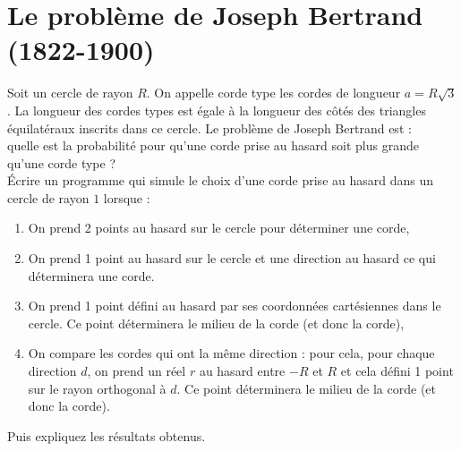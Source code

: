 \documentclass[a4paper,11pt]{book}
\begin{document}
\section{Le probl\`eme de Joseph Bertrand (1822-1900)}
Soit un cercle de rayon $R$. On appelle corde type les cordes de longueur 
$a=R\sqrt 3$. La longueur des cordes types est \'egale \`a la longueur des 
c\^ot\'es des triangles \'equilat\'eraux inscrits dans ce cercle. Le probl\`eme
de Joseph Bertrand est :\\
quelle est la probabilit\'e pour qu'une corde prise au hasard soit plus grande 
qu'une corde type ?\\
\'Ecrire un programme qui simule le choix d'une corde prise au hasard dans un 
cercle de rayon $1$ lorsque :
\begin{enumerate}
\item On prend 2 points au hasard sur le cercle pour d\'eterminer une corde,
\item  On prend 1 point au hasard sur le cercle et une direction au hasard ce 
qui d\'eterminera une corde.
\item On prend 1 point d\'efini au hasard par ses coordonn\'ees cart\'esiennes 
dans le cercle. Ce point d\'eterminera le milieu de 
la corde (et donc la corde),
\item On compare les cordes qui ont la m\^eme direction : pour cela, pour
chaque direction $d$, on prend un r\'eel $r$ au hasard entre 
$-R$ et $R$ et cela d\'efini 1 point sur le rayon orthogonal \`a $d$. Ce point 
d\'eterminera le milieu de la corde (et donc la corde). 
 \end{enumerate}
Puis expliquez les r\'esultats obtenus.\\
\end{document}
